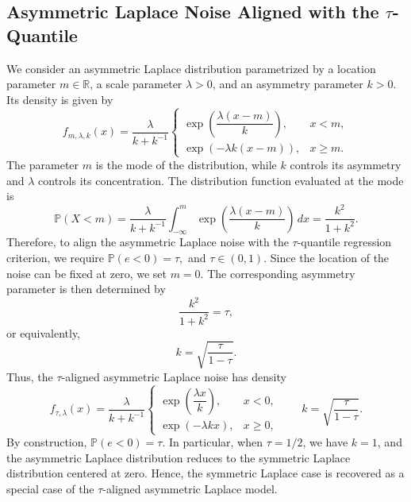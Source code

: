 \documentclass[12pt,a4paper]{article}
\begin{document}
	{\color{blue}
		\subsection{Asymmetric Laplace Noise Aligned with the $\tau$-Quantile}
		\label{sec:general_AL_intro}
		
		We consider an asymmetric Laplace distribution parametrized by a location parameter
		$m\in\mathbb{R}$, a scale parameter $\lambda>0$, and an asymmetry parameter
		$k>0$. Its density is given by
		\[
		f_{m,\lambda,k}(x)
		=
		\frac{\lambda}{k+k^{-1}}
		\begin{cases}
			\exp\left(\dfrac{\lambda(x-m)}{k}\right), & x<m, \\[8pt]
			\exp\left(-\lambda k(x-m)\right), & x\geq m.
		\end{cases}
		\]
		The parameter $m$ is the mode of the distribution, while $k$ controls its
		asymmetry and $\lambda$ controls its concentration.
		The distribution function evaluated at the mode is
		\[
		\mathbb{P}(X<m)
		=
		\frac{\lambda}{k+k^{-1}}
		\int_{-\infty}^{m}
		\exp\left(\frac{\lambda(x-m)}{k}\right)\,dx
		=
		\frac{k^2}{1+k^2}.
		\]
		Therefore, to align the asymmetric Laplace noise with the $\tau$-quantile
		regression criterion, we require
		\(
		\mathbb{P}(e<0)=\tau,
		\)
		and
		\(
		\tau\in(0,1).
		\)
		Since the location of the noise can be fixed at zero, we set $m=0$. The
		corresponding asymmetry parameter is then determined by
		\[
		\frac{k^2}{1+k^2}=\tau,
		\]
		or equivalently,
		\[
		k=\sqrt{\frac{\tau}{1-\tau}}.
		\]
		Thus, the $\tau$-aligned asymmetric Laplace noise has density
		\[
		f_{\tau,\lambda}(x)
		=
		\frac{\lambda}{k+k^{-1}}
		\begin{cases}
			\exp\left(\dfrac{\lambda x}{k}\right), & x<0, \\[8pt]
			\exp(-\lambda kx), & x\geq 0,
		\end{cases}
		\qquad
		k=\sqrt{\frac{\tau}{1-\tau}}.
		\]
		By construction,
		\(
		\mathbb{P}(e<0)=\tau.
		\)
		In particular, when $\tau=1/2$, we have $k=1$, and the asymmetric Laplace
		distribution reduces to the symmetric Laplace distribution centered at zero.
		Hence, the symmetric Laplace case is recovered as a special case of the
		$\tau$-aligned asymmetric Laplace model.}
	
\end{document}
